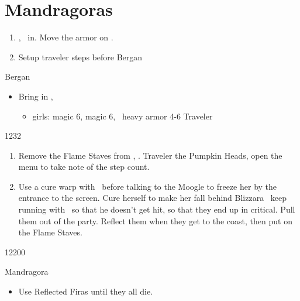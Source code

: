 \chapter{Mandragoras}

\begin{enumerate}
	\item \basch, \balthier\ in. Move the armor on \basch.
	\item Setup traveler steps before Bergan
\end{enumerate}
\begin{battle}{Bergan}
	\begin{itemize}
		\vaanf Run up to Bergan
		\item Bring in \ashe, \penelo
		      \begin{liscense}
			      \begin{itemize}
				      \item girls: magic 6, magic 6, \vaan\ heavy armor 4-6
				            \vaanf Traveler
			      \end{itemize}
		      \end{liscense}
	\end{itemize}
\end{battle}
\begin{shop}{1232}
\end{shop}
\begin{enumerate}
	\item Remove the Flame Staves from \ashe, \penelo.
	      \vaanf Traveler the Pumpkin Heads, open the menu to take note of the step count.
	\item Use a cure warp with \ashe\ before talking to the Moogle to freeze her by the entrance to the screen.
	      \ashef Cure herself to make her fall behind
	      \penelof Blizzara \ashe\, keep running with \vaan\ so that he doesn't get hit, so that they end up in critical. Pull them out of the party. Reflect them when they get to the coast, then put on the Flame Staves.
\end{enumerate}
\begin{shop}{12200}
\end{shop}
\begin{battle}{Mandragora}
	\begin{itemize}
		\vaanf Wait for them to gather up, then Traveler them.
		\item Use Reflected Firas until they all die.
	\end{itemize}
\end{battle}